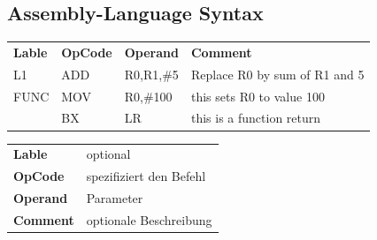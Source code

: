 \subsection{Assembly-Language Syntax}
\begin{tabular}{llll}
    \textbf{Lable}  &\textbf{OpCode}  &\textbf{Operand}  & \textbf{Comment} \\ 
    L1  & ADD &R0,R1,\#5    & Replace R0 by sum of R1 and 5 \\ 
    FUNC& MOV &R0,\#100     & this sets R0 to value 100 \\  
        & BX  &LR           & this is a function return\\
\end{tabular} 
\begin{tabular}{|ll}
    \textbf{Lable}  & optional  \\ 
    \textbf{OpCode} & spezifiziert den Befehl \\ 
    \textbf{Operand}& Parameter  \\ 
    \textbf{Comment}&  optionale Beschreibung\\ 
\end{tabular} 
\\
